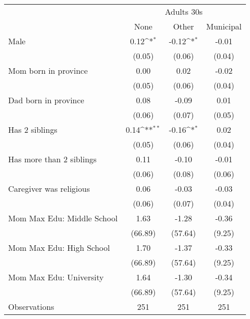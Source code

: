 {
\def\sym#1{\ifmmode^{#1}\else\(^{#1}\)\fi}
\begin{tabular}{l*{3}{c}}
\toprule
& \multicolumn{3}{c}{Adults 30s} \\
                    &\multicolumn{1}{c}{None}&\multicolumn{1}{c}{Other}&\multicolumn{1}{c}{Municipal}\\
\midrule
Male                &        0.12\sym{*}  &       -0.12\sym{*}  &       -0.01         \\
                    &      (0.05)         &      (0.06)         &      (0.04)         \\
\addlinespace
Mom born in province&        0.00         &        0.02         &       -0.02         \\
                    &      (0.05)         &      (0.06)         &      (0.04)         \\
\addlinespace
Dad born in province&        0.08         &       -0.09         &        0.01         \\
                    &      (0.06)         &      (0.07)         &      (0.05)         \\
\addlinespace
Has 2 siblings      &        0.14\sym{**} &       -0.16\sym{*}  &        0.02         \\
                    &      (0.05)         &      (0.06)         &      (0.04)         \\
\addlinespace
Has more than 2 siblings&        0.11         &       -0.10         &       -0.01         \\
                    &      (0.06)         &      (0.08)         &      (0.06)         \\
\addlinespace
Caregiver was religious&        0.06         &       -0.03         &       -0.03         \\
                    &      (0.06)         &      (0.07)         &      (0.04)         \\
\addlinespace
Mom Max Edu: Middle School&        1.63         &       -1.28         &       -0.36         \\
                    &     (66.89)         &     (57.64)         &      (9.25)         \\
\addlinespace
Mom Max Edu: High School&        1.70         &       -1.37         &       -0.33         \\
                    &     (66.89)         &     (57.64)         &      (9.25)         \\
\addlinespace
Mom Max Edu: University&        1.64         &       -1.30         &       -0.34         \\
                    &     (66.89)         &     (57.64)         &      (9.25)         \\
\midrule
Observations        &         251         &         251         &         251         \\
\bottomrule
\end{tabular}
}

